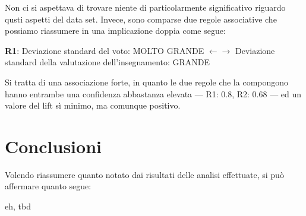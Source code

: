             

            Non ci si aspettava di trovare niente di particolarmente significativo riguardo qusti aspetti del data set. Invece, sono comparse due regole associative che possiamo riassumere in una implicazione doppia come segue:

            \begin{center}
                \textbf{R1}: Deviazione standard del voto: MOLTO GRANDE $\leftarrow \rightarrow$ Deviazione standard della valutazione dell'insegnamento: GRANDE
            \end{center}

            Si tratta di una associazione forte, in quanto le due regole che la compongono hanno entrambe una confidenza abbastanza elevata --- R1: 0.8, R2: 0.68 --- ed un valore del lift sì minimo, ma comunque positivo. \\

\section{Conclusioni}

    Volendo riassumere quanto notato dai risultati delle analisi effettuate, si può affermare quanto segue:

    eh, tbd